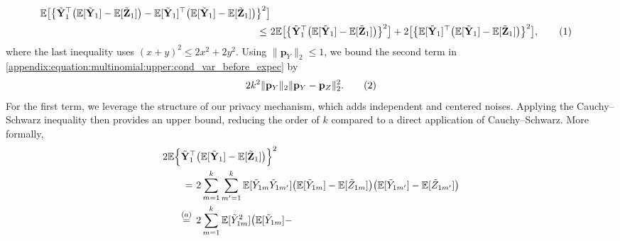 \documentclass[twoside,11pt]{article}
\newcommand\numberthis{\addtocounter{equation}{1}\tag{\theequation}}
\newcommand{\rvTwo}{Y}
\newcommand{\rvThree}{Z}
\newcommand{\vectorize}[1]{\mathbf{#1}}
\newcommand{\mE}{\mathbb{E}} %
\newcommand{\alphabetSize}{k} %
\newcommand{\vectorIndex}{m}
\newcommand{\probVec}{\mathbf{p}} %
\begin{document}
\begin{appendix}
\begin{align*}
		\mE
		\bigl[
		\bigl\{
		\tilde{\vectorize{\rvTwo}}_1^\top
		\bigl(
		\mE [ \tilde{\vectorize{\rvTwo}}_{1}] - \mE [ \tilde{\vectorize{\rvThree}}_{1}]
		\bigr)
		-
		\mE [ \tilde{\vectorize{\rvTwo}}_{1}]^\top
		\bigl(
		\mE [ \tilde{\vectorize{\rvTwo}}_{1}] - \mE [ \tilde{\vectorize{\rvThree}}_{1}]
		\bigr)
		\bigr\}^2
		\bigr]
		\\  \leq ~ &
		2 \mE 
		\bigl[
		\bigl\{
		\tilde{\vectorize{\rvTwo}}_1^\top 
		\bigl(
		\mE [ \tilde{\vectorize{\rvTwo}}_{1}] - \mE [ \tilde{\vectorize{\rvThree}}_{1}]
		\bigr)
		\bigr\}^2
		\bigr]
		+
		2 
		\bigl[
		\bigl\{
		\mE [ \tilde{\vectorize{\rvTwo}}_{1}]^\top
		\bigl(
		\mE [ \tilde{\vectorize{\rvTwo}}_{1}] - \mE [ \tilde{\vectorize{\rvThree}}_{1}]
		\bigr)
		\bigr\}^2
		\bigr],
		\numberthis \label{appendix:equation:multinomial:upper:cond_var_before_expec}
	\end{align*}
	where the last inequality uses $(x+y)^2 \leq 2x^2 + 2y^2$. Using $\|\probVec_\rvTwo\|_2 \leq 1$, we bound the second term in \eqref{appendix:equation:multinomial:upper:cond_var_before_expec} by
	\begin{align*}
		2\alphabetSize^2 \|\probVec_\rvTwo\|_2
		\|\probVec_\rvTwo - \probVec_\rvThree\|_2^2.
		\numberthis \label{appendix:equation:multinomial:upper:cond_var_term_2}
	\end{align*}
	For the first term, we leverage the structure of our privacy mechanism, which adds independent and centered noises. Applying the Cauchy--Schwarz inequality then provides an upper bound, reducing the order of $\alphabetSize$ compared to a direct application of Cauchy--Schwarz. More formally,
	\begin{align*}
		2 \mE
		\Bigl\{
		\tilde{\vectorize{\rvTwo}}_1^\top&
		\bigl(
		\mE [ \tilde{\vectorize{\rvTwo}}_{1}] - \mE [ \tilde{\vectorize{\rvThree}}_{1}]
		\bigr)
		\Bigr\}^2
		\\ = ~ &
		2\sum_{\vectorIndex=1}^\alphabetSize
		\sum_{\vectorIndex'=1}^\alphabetSize
		\mE[
		\tilde{\rvTwo}_{1 \vectorIndex}
		\tilde{\rvTwo}_{1 \vectorIndex'}
		]
		\bigl(
		\mE [ \tilde{\rvTwo}_{1 \vectorIndex}]
		-
		\mE [ \tilde{\rvThree}_{1 \vectorIndex}]
		\bigr)
		\bigl(
		\mE [ \tilde{\rvTwo}_{1 \vectorIndex'}]
		-
		\mE [ \tilde{\rvThree}_{1 \vectorIndex'}]
		\bigr) 
		\\ \stackrel{(a)}{=} \hskip 1.57mm &
		2\sum_{\vectorIndex=1}^\alphabetSize
		\mE[ \tilde{\rvTwo}_{1 \vectorIndex}^2 ]
		\bigl(
		\mE [ \tilde{\rvTwo}_{1 \vectorIndex}]
		-

\end{align*}
\end{appendix}
\end{document}
